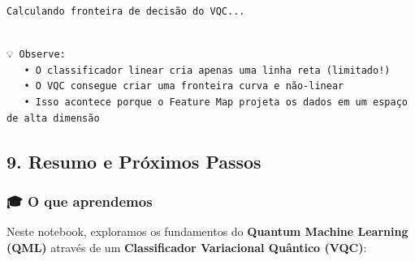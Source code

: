 \documentclass[
  brazilian,
]{report}
\begin{document}
\begin{verbatim}
Calculando fronteira de decisão do VQC...
\end{verbatim}

\begin{verbatim}

💡 Observe:
   • O classificador linear cria apenas uma linha reta (limitado!)
   • O VQC consegue criar uma fronteira curva e não-linear
   • Isso acontece porque o Feature Map projeta os dados em um espaço de alta dimensão
\end{verbatim}

\subsection{9. Resumo e Próximos
Passos}\label{resumo-e-pruxf3ximos-passos}

\subsubsection{🎓 O que aprendemos}\label{o-que-aprendemos}

Neste notebook, exploramos os fundamentos do \textbf{Quantum Machine
Learning (QML)} através de um \textbf{Classificador Variacional Quântico
(VQC)}:
\end{document}
